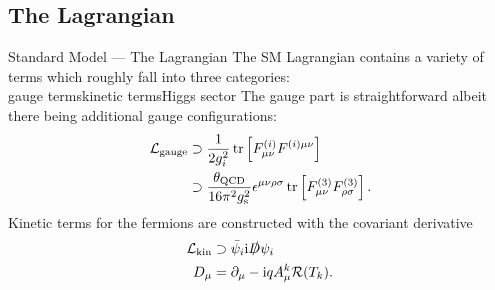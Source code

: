 \subsection{The Lagrangian}
\begin{frame}{Standard Model — The Lagrangian}
The SM Lagrangian contains a variety of terms which roughly fall into three categories:\\
\vfill
\alert{gauge terms\hfill kinetic terms\hfill Higgs sector\hfill\hfill}
\vfill
The gauge part is straightforward albeit there being additional gauge configurations:
\begin{align*}
  \mathcal{L}_\text{gauge}&\supset\frac1{2g_i^2}\tr\left[F^{(i)}_{\mu\nu}F^{(i)\mu\nu}\right]\\
  &\supset\frac{\theta_\mathrm{QCD}}{16\pi^2g_\mathrm{s}^2}\epsilon^{\mu\nu\rho\sigma}\tr\left[F^{(3)}_{\mu\nu}F^{(3)}_{\rho\sigma}\right].
\end{align*}
Kinetic terms for the fermions are constructed with the covariant derivative
\begin{align*}
  \mathcal{L}_\mathrm{kin}&\supset\bar{\psi}_i\mathrm{i}\slashed{D}\psi_i\\
  D_\mu&=\partial_\mu-\mathrm{i} qA^k_\mu\mathcal{R}(T_k).
\end{align*}
\end{frame}

